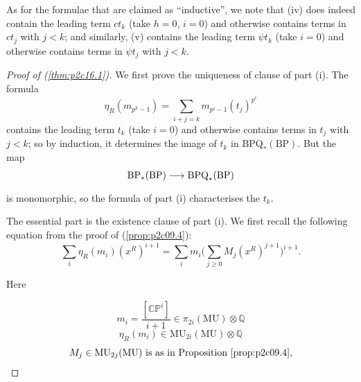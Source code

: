 \documentclass[../main]{subfiles}
\begin{document}
As for the formulae that are claimed as ``inductive'', we note that (iv) does indeed contain the leading term $c t_k$ (take $h = 0$, $i = 0$) and otherwise contains terms in $c t_j$ with $j < k$; and similarly, (v) contains the leading term $\psi t_k$ (take $i = 0$) and otherwise contains terms in $\psi t_j$ with $j < k$. 

\begin{proof}[Proof of (\ref{thm:p2c16.1})]
We first prove the uniqueness of clause of part (i). The formula \[\eta_R (m_{p^k - 1}) = \sum_{i + j = k} m_{p^i - 1} (t_j)^{p^i}\] contains the leading term $t_k$ (take $i = 0$) and otherwise contains terms in $t_j$ with $j < k$; so by induction, it determines the image of $t_k$ in $\mathrm {BPQ}_\ast(\mathrm {BP})$. But the map \[\mathrm {BP}_\ast(\mathrm {BP}) \lar{} \mathrm{BPQ}_\ast(\mathrm{BP})\] is monomorphic, so the formula of part (i) characterises the $t_k$. 

The essential part is the existence clause of part (i). We first recall the following equation from the proof of (\ref{prop:p2c09.4}): 
\begin{equation}
\tag{16.2}
\label{eqn:p2c16.2}
\sum_i \eta_R (m_i) (x^R)^{i + 1} = \sum_i m_i \bigg(\sum_{j \ge 0} M_j (x^R)^{j + 1}\bigg)^{i + 1}.
\end{equation}

Here

\[m_i = \frac {[\mathbb {CP}^i]} {i + 1} \in \pi_{2i} (\mathrm {MU}) \otimes \mathbb Q\]
\[\eta_R(m_i) \in \mathrm{MU}_{2i}(\mathrm{MU}) \otimes \mathbb Q\]
\[M_j \in \mathrm{MU}_{2j}(\mathrm{MU}) \text { is as in Proposition } \ref{prop:p2c09.4},\]


\end{proof}
\end{document}
